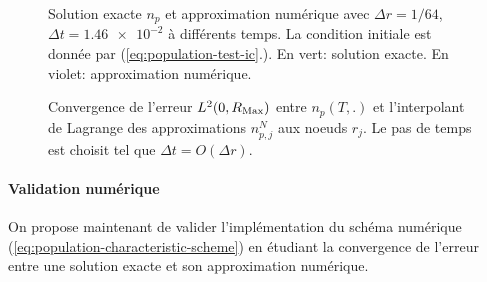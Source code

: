 \begin{figure}[h]
  \begin{center}
    
    
    
    
    
    
  \end{center}
  \begin{center}
    \caption{Solution exacte $n_p$ et approximation numérique avec
      $\Delta r = 1/64$, $\Delta t = \num{1.46e-2}$ à différents
      temps. La condition initiale est donnée par
      (\ref{eq:population-test-ic}.). En vert: solution exacte. En
      violet: approximation numérique.}
    \label{fig:population-timelapse}
  \end{center}
\end{figure}

\begin{figure}[h!]
  \begin{center}
    
    \caption{Convergence de l'erreur $L^2(0, R_\mathrm{Max})$ entre $n_p(T, .)$
    et l'interpolant de Lagrange des approximations $n_{p,j}^N$ aux
    noeuds $r_j$. Le pas de temps est choisit tel que $\Delta t =
    O(\Delta r)$.}
    \label{fig:population-convergence}
  \end{center}
\end{figure}
\paragraph{Validation numérique} On propose maintenant de valider
l'implémentation du schéma numérique
(\ref{eq:population-characteristic-scheme}) en étudiant la
convergence de l'erreur entre une solution exacte et son approximation
numérique.

